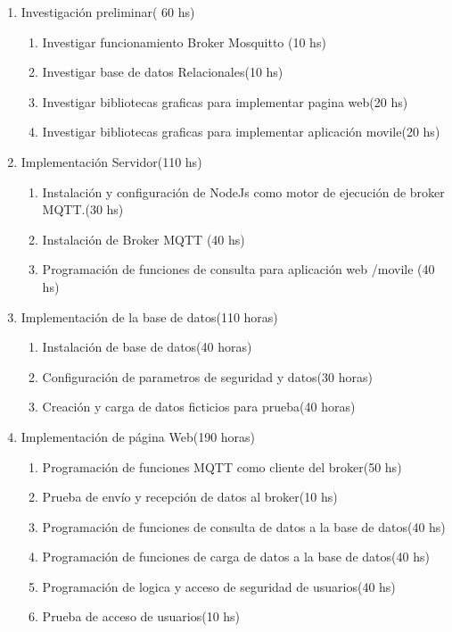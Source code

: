 \documentclass[
11pt, %
]{charter}
\begin{document}
\begin{enumerate}
\item Investigación preliminar( 60 hs)
	\begin{enumerate}
	\item Investigar funcionamiento Broker Mosquitto (10 hs)
	\item Investigar base de datos Relacionales(10 hs)
	\item Investigar bibliotecas graficas para implementar pagina web(20 hs)
	\item Investigar bibliotecas graficas para implementar aplicación movile(20 hs)
	\end{enumerate}
\item Implementación Servidor(110 hs)
	\begin{enumerate}
	\item Instalación y configuración de NodeJs como motor de ejecución de broker MQTT.(30 hs)
	\item Instalación de Broker MQTT (40 hs)
	\item Programación de funciones de consulta para aplicación web /movile (40 hs)

	\end{enumerate}
\item Implementación de la base de datos(110 horas)
	\begin{enumerate}
	\item Instalación de base de datos(40 horas)
	\item Configuración de parametros de seguridad y datos(30 horas)
	\item Creación y carga de datos ficticios para prueba(40 horas)

	\end{enumerate}
\item Implementación de página Web(190 horas)
	\begin{enumerate}
	\item Programación de funciones MQTT como cliente del broker(50 hs)
	\item Prueba de envío y recepción de datos al broker(10 hs)
	\item Programación de funciones de consulta de datos a la base de datos(40 hs)
	\item Programación de funciones de carga de datos a la base de datos(40 hs)
	\item Programación de logica y acceso de seguridad de usuarios(40 hs)
	\item Prueba de acceso de usuarios(10 hs)
	\end{enumerate}
	

\end{enumerate}
\end{document}
